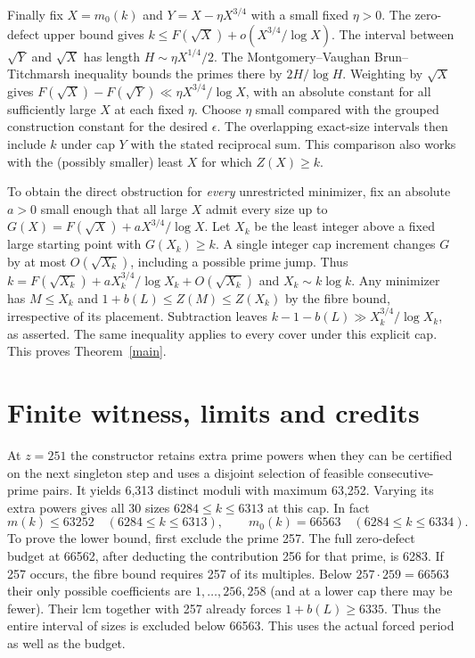 \documentclass[11pt]{article}
\begin{document}
Finally fix $X=m_0(k)$ and $Y=X-\eta X^{3/4}$ with a small fixed $\eta>0$. The zero-defect upper bound gives $k\le F(\sqrt X)+o(X^{3/4}/\log X)$. The interval between $\sqrt Y$ and $\sqrt X$ has length $H\sim\eta X^{1/4}/2$. The Montgomery--Vaughan Brun--Titchmarsh inequality bounds the primes there by $2H/\log H$. Weighting by $\sqrt X$ gives $F(\sqrt X)-F(\sqrt Y)\ll\eta X^{3/4}/\log X$, with an absolute constant for all sufficiently large $X$ at each fixed $\eta$. Choose $\eta$ small compared with the grouped construction constant for the desired $\epsilon$. The overlapping exact-size intervals then include $k$ under cap $Y$ with the stated reciprocal sum. This comparison also works with the (possibly smaller) least $X$ for which $Z(X)\ge k$.

To obtain the direct obstruction for \emph{every} unrestricted minimizer, fix an absolute $a>0$ small enough that all large $X$ admit every size up to $G(X)=F(\sqrt X)+aX^{3/4}/\log X$. Let $X_k$ be the least integer above a fixed large starting point with $G(X_k)\ge k$. A single integer cap increment changes $G$ by at most $O(\sqrt{X_k})$, including a possible prime jump. Thus $k=F(\sqrt{X_k})+aX_k^{3/4}/\log X_k+O(\sqrt{X_k})$ and $X_k\sim k\log k$. Any minimizer has $M\le X_k$ and $1+b(L)\le Z(M)\le Z(X_k)$ by the fibre bound, irrespective of its placement. Subtraction leaves $k-1-b(L)\gg X_k^{3/4}/\log X_k$, as asserted. The same inequality applies to every cover under this explicit cap. This proves Theorem~\ref{main}.

\section{Finite witness, limits and credits}
At $z=251$ the constructor retains extra prime powers when they can be certified on the next singleton step and uses a disjoint selection of feasible consecutive-prime pairs. It yields 6,313 distinct moduli with maximum 63,252. Varying its extra powers gives all 30 sizes $6284\le k\le6313$ at this cap. In fact
\[
 m(k)\le63252\quad(6284\le k\le6313),\qquad
 m_0(k)=66563\quad(6284\le k\le6334).
\]
To prove the lower bound, first exclude the prime 257. The full zero-defect budget at 66562, after deducting the contribution 256 for that prime, is 6283. If 257 occurs, the fibre bound requires 257 of its multiples. Below $257\cdot259=66563$ their only possible coefficients are $1,\ldots,256,258$ (and at a lower cap there may be fewer). Their lcm together with 257 already forces $1+b(L)\ge6335$. Thus the entire interval of sizes is excluded below 66563. This uses the actual forced period as well as the budget.
\end{document}
